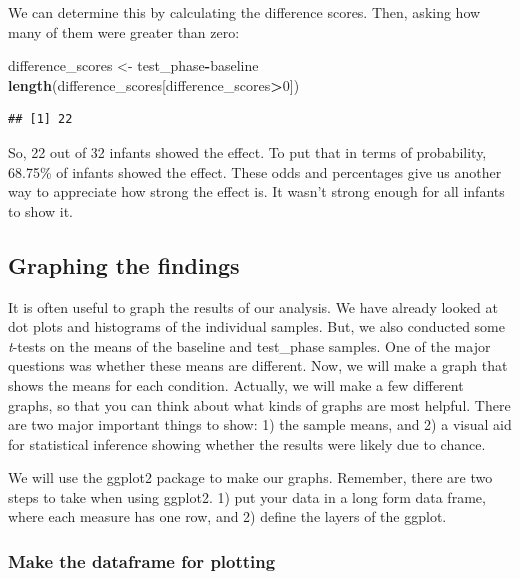 \documentclass[
]{book}
\newenvironment{Shaded}{\begin{snugshade}}{\end{snugshade}}
\newcommand{\DecValTok}[1]{\textcolor[rgb]{0.00,0.00,0.81}{#1}}
\newcommand{\FunctionTok}[1]{\textcolor[rgb]{0.13,0.29,0.53}{\textbf{#1}}}
\newcommand{\NormalTok}[1]{#1}
\newcommand{\OtherTok}[1]{\textcolor[rgb]{0.56,0.35,0.01}{#1}}
\newcommand{\SpecialCharTok}[1]{\textcolor[rgb]{0.81,0.36,0.00}{\textbf{#1}}}
\begin{document}
We can determine this by calculating the difference scores. Then, asking how many of them were greater than zero:

\begin{Shaded}
\begin{Highlighting}[]
\NormalTok{difference\_scores }\OtherTok{\textless{}{-}}\NormalTok{ test\_phase}\SpecialCharTok{{-}}\NormalTok{baseline}
\FunctionTok{length}\NormalTok{(difference\_scores[difference\_scores}\SpecialCharTok{\textgreater{}}\DecValTok{0}\NormalTok{])}
\end{Highlighting}
\end{Shaded}

\begin{verbatim}
## [1] 22
\end{verbatim}

So, 22 out of 32 infants showed the effect. To put that in terms of probability, 68.75\% of infants showed the effect. These odds and percentages give us another way to appreciate how strong the effect is. It wasn't strong enough for all infants to show it.

\hypertarget{graphing-the-findings}{%
\subsection{Graphing the findings}\label{graphing-the-findings}}

It is often useful to graph the results of our analysis. We have already looked at dot plots and histograms of the individual samples. But, we also conducted some \emph{t}-tests on the means of the baseline and test\_phase samples. One of the major questions was whether these means are different. Now, we will make a graph that shows the means for each condition. Actually, we will make a few different graphs, so that you can think about what kinds of graphs are most helpful. There are two major important things to show: 1) the sample means, and 2) a visual aid for statistical inference showing whether the results were likely due to chance.

We will use the ggplot2 package to make our graphs. Remember, there are two steps to take when using ggplot2. 1) put your data in a long form data frame, where each measure has one row, and 2) define the layers of the ggplot.

\hypertarget{make-the-dataframe-for-plotting}{%
\subsubsection{Make the dataframe for plotting}\label{make-the-dataframe-for-plotting}}
\end{document}
